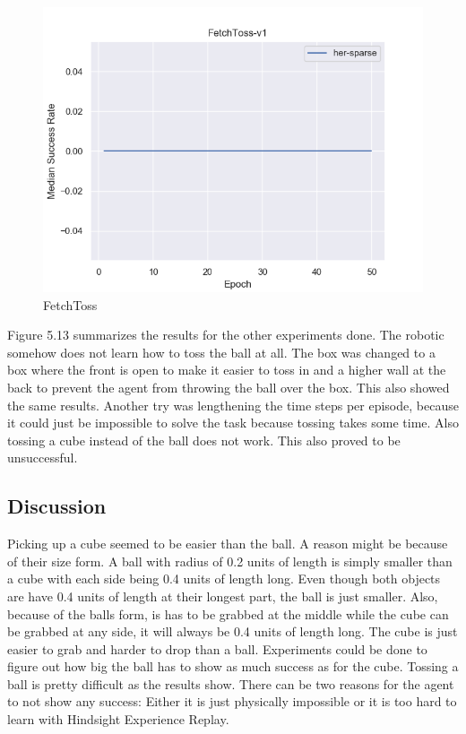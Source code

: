 \begin{figure} [h]
	
	\centering
	\includegraphics[width=1\textwidth]{figures/fig_FetchToss-v1.png}
	\caption{FetchToss}
	
\end{figure}
 
Figure 5.13 summarizes the results for the other experiments done.  The robotic somehow does not learn how to toss the ball at all. The box was changed to a box where the front is open to make it easier to toss in and a higher wall at the back to prevent the agent from throwing the ball over the box. This also showed the same results. Another try was lengthening the time steps per episode, because it could just be impossible to solve the task because tossing takes some time. Also tossing a cube instead of the ball does not work. %
This also proved to be unsuccessful. 

\subsection{Discussion}


Picking up a cube seemed to be easier than the ball. A reason might be because of their size form. A ball with radius of %
0.2 units of length is simply smaller than a cube with each side being 0.4 units of length long. Even though both objects are have 0.4 units of length at their longest part, the ball is just smaller. Also, because of the balls form, is has to be grabbed at the middle while the cube can be grabbed at any side, it will always be 0.4 units of length long. The cube is just easier to grab and harder to drop than a ball. Experiments could be done to figure out how big the ball has to show as much success as for the cube. 
Tossing a ball is pretty difficult as the results show. There can be two reasons for the agent to not show any success: Either it is just physically impossible or %
it is too hard to learn with Hindsight Experience Replay. 



